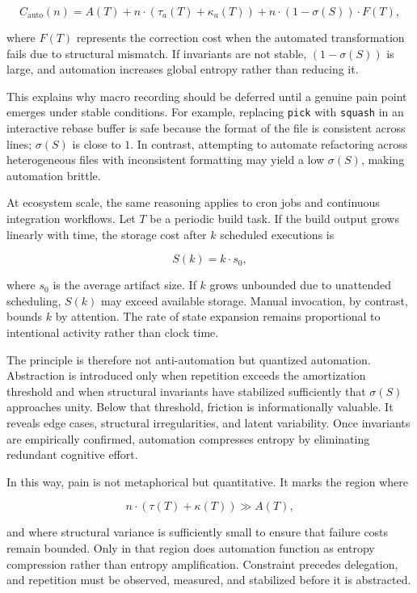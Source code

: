 \documentclass[12pt]{article}
\begin{document}
\[
C_{\text{auto}}(n) = A(T) + n \cdot (\tau_a(T) + \kappa_a(T)) + n \cdot (1 - \sigma(S)) \cdot F(T),
\]

where $F(T)$ represents the correction cost when the automated transformation fails due to structural mismatch. If invariants are not stable, $(1 - \sigma(S))$ is large, and automation increases global entropy rather than reducing it.

This explains why macro recording should be deferred until a genuine pain point emerges under stable conditions. For example, replacing \texttt{pick} with \texttt{squash} in an interactive rebase buffer is safe because the format of the file is consistent across lines; $\sigma(S)$ is close to $1$. In contrast, attempting to automate refactoring across heterogeneous files with inconsistent formatting may yield a low $\sigma(S)$, making automation brittle.

At ecosystem scale, the same reasoning applies to cron jobs and continuous integration workflows. Let $T$ be a periodic build task. If the build output grows linearly with time, the storage cost after $k$ scheduled executions is

\[
S(k) = k \cdot s_0,
\]

where $s_0$ is the average artifact size. If $k$ grows unbounded due to unattended scheduling, $S(k)$ may exceed available storage. Manual invocation, by contrast, bounds $k$ by attention. The rate of state expansion remains proportional to intentional activity rather than clock time.

The principle is therefore not anti-automation but quantized automation. Abstraction is introduced only when repetition exceeds the amortization threshold and when structural invariants have stabilized sufficiently that $\sigma(S)$ approaches unity. Below that threshold, friction is informationally valuable. It reveals edge cases, structural irregularities, and latent variability. Once invariants are empirically confirmed, automation compresses entropy by eliminating redundant cognitive effort.

In this way, pain is not metaphorical but quantitative. It marks the region where

\[
n \cdot (\tau(T) + \kappa(T)) \gg A(T),
\]

and where structural variance is sufficiently small to ensure that failure costs remain bounded. Only in that region does automation function as entropy compression rather than entropy amplification. Constraint precedes delegation, and repetition must be observed, measured, and stabilized before it is abstracted.
\end{document}
